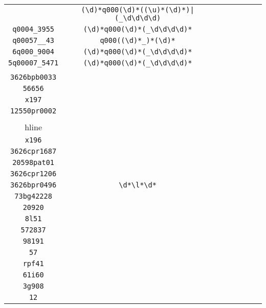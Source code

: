 \begin{longtable}{cccccccc}
\begin{tabular}{ll}
    \verb|q000_5283| & \verb.(\d)*q000(\d)*((\u)*(\d)*)|(_\d\d\d\d).\\
\verb|q0004_3955| & \verb|(\d)*q000(\d)*(_\d\d\d\d)*|\\
\verb|q00057__43| & \verb|q000((\d)*_)*(\d)*|\\
\verb|6q000_9004| & \verb|(\d)*q000(\d)*(_\d\d\d\d)*|\\
\verb|5q00007_5471| & \verb|(\d)*q000(\d)*(_\d\d\d\d)*|
\end{tabular}
\\\midrule 
\begin{tabular}{l}
    \verb|3626cpr1748|\\
\verb|3626bpb0033|\\
\verb|56656|\\
\verb|x197|\\
\verb|12550pr0002|\\
\\hline\\
\verb|x196|\\
\verb|3626cpr1687|\\
\verb|20598pat01|\\
\verb|3626cpr1206|\\
\verb|3626bpr0496|
\end{tabular}

&
\verb|\d*\l*\d*|
&

\begin{tabular}{l}
    \verb|(\d)*(\l)*(\d)*\d\d|\\
\verb|73bg42228|\\
\verb|20920|\\
\verb|8l51|\\
\verb|572837|\\
\verb|98191|
\end{tabular}

&

\begin{tabular}{l}
    \verb|(\d)*(\l)*(\d)*\d\d|\\
\verb|57|\\
\verb|rpf41|\\
\verb|61i60|\\
\verb|3g908|\\
\verb|12|
\end{tabular}

&


\end{longtable}
